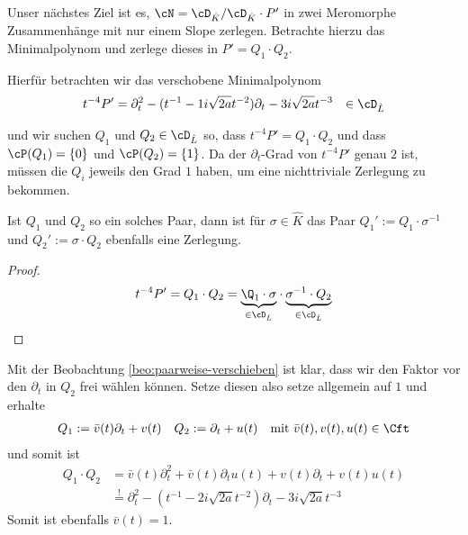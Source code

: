 Unser nächstes Ziel ist es, $\cN=\cD_{\hat K}/\cD_{\hat K}\cdot P'$ in zwei
Meromorphe Zusammenhänge mit nur einem Slope zerlegen.  Betrachte hierzu das
Minimalpolynom und zerlege dieses in $P'=Q_1\cdot Q_2$.

Hierfür betrachten wir das verschobene Minimalpolynom 
\begin{align*}
t^{-4}P'&=\partial_t^2 - (t^{-1} - 1i\sqrt{2a}t^{-2})\partial_t - 3
i\sqrt{2a}t^{-3} & \in \cD_{\hat L}
\end{align*}
\begin{figure}[H]
\begin{center}
\end{center}
\end{figure}
und wir suchen $Q_1$ und $Q_2\in \cD_{\hat L}$ so, dass $t^{-4}P'=Q_1\cdot
Q_2$ und dass $\cP(Q_1)=\{0\}$ und $\cP(Q_2)=\{1\}$.
Da der $\partial_t$-Grad von $t^{-4}P'$ genau $2$ ist, müssen die $Q_i$
jeweils den Grad $1$ haben, um eine nichttriviale Zerlegung zu bekommen.
\begin{beo} \label{beo:paarweise-verschieben}
Ist $Q_1$ und $Q_2$ so ein solches Paar, dann ist für $\sigma\in \hat K$ das
Paar $Q_1':=Q_1\cdot \sigma^{-1}$ und $Q_2':=\sigma\cdot Q_2$ ebenfalls eine
Zerlegung.
\end{beo}
\begin{proof}
\[
t^{-4}P'=Q_1\cdot Q_2=
\underset{\in\cD_{\hat L}}{\underbrace{
  \Q_1\cdot\sigma
}}
\cdot
\underset{\in\cD_{\hat L}}{\underbrace{
  \sigma^{-1}\cdot Q_2
}}
\]
\end{proof}
Mit der Beobachtung \ref{beo:paarweise-verschieben} ist klar, dass wir
den Faktor vor den $\partial_t$ in $Q_2$ frei wählen können. Setze diesen
also setze allgemein auf $1$ und erhalte
\begin{align*}
Q_1&:=\bar v(t) \partial_t + v(t) & Q_2&:=\partial_t + u(t)
& \mbox{mit } \bar v(t), v(t), u(t)\in \Cft
\end{align*}
und somit ist 
\begin{equation} \label{eq:schritt100}
  \begin{aligned}
Q_1\cdot Q_2&=\bar v(t) \partial_t^2 + \bar v(t)\partial_t u(t) +
  v(t)\partial_t + v(t)u(t)
\\&\overset{!}{=} \partial_t^2 - (t^{-1} - 2i\sqrt{2a}t^{-2})\partial_t 
  - 3 i\sqrt{2a}t^{-3}
  \end{aligned}
\end{equation}
Somit ist ebenfalls $\bar v(t)=1$. 

